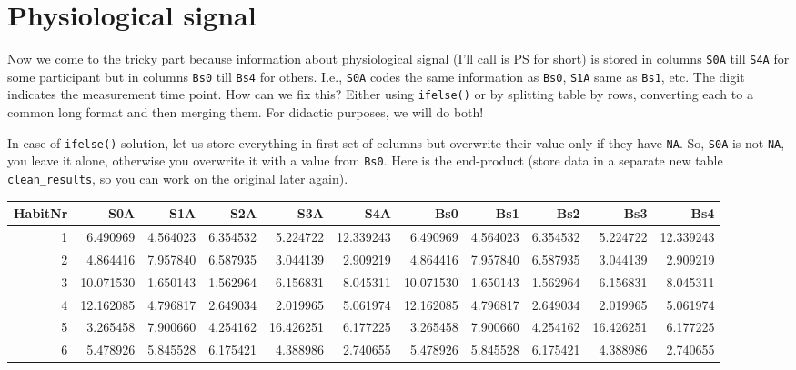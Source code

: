\documentclass[
]{book}
\begin{document}
\hypertarget{physiological-signal}{%
\section{Physiological signal}\label{physiological-signal}}

Now we come to the tricky part because information about physiological signal (I'll call is PS for short) is stored in columns \texttt{S0A} till \texttt{S4A} for some participant but in columns \texttt{Bs0} till \texttt{Bs4} for others. I.e., \texttt{S0A} codes the same information as \texttt{Bs0}, \texttt{S1A} same as \texttt{Bs1}, etc. The digit indicates the measurement time point. How can we fix this? Either using \texttt{ifelse()} or by splitting table by rows, converting each to a common long format and then merging them. For didactic purposes, we will do both!

In case of \texttt{ifelse()} solution, let us store everything in first set of columns but overwrite their value only if they have \texttt{NA}. So, \texttt{S0A} is not \texttt{NA}, you leave it alone, otherwise you overwrite it with a value from \texttt{Bs0}. Here is the end-product (store data in a separate new table \texttt{clean\_results}, so you can work on the original later again).

\begin{tabular}{r|r|r|r|r|r|r|r|r|r|r}
\hline
HabitNr & S0A & S1A & S2A & S3A & S4A & Bs0 & Bs1 & Bs2 & Bs3 & Bs4\\
\hline
1 & 6.490969 & 4.564023 & 6.354532 & 5.224722 & 12.339243 & 6.490969 & 4.564023 & 6.354532 & 5.224722 & 12.339243\\
\hline
2 & 4.864416 & 7.957840 & 6.587935 & 3.044139 & 2.909219 & 4.864416 & 7.957840 & 6.587935 & 3.044139 & 2.909219\\
\hline
3 & 10.071530 & 1.650143 & 1.562964 & 6.156831 & 8.045311 & 10.071530 & 1.650143 & 1.562964 & 6.156831 & 8.045311\\
\hline
4 & 12.162085 & 4.796817 & 2.649034 & 2.019965 & 5.061974 & 12.162085 & 4.796817 & 2.649034 & 2.019965 & 5.061974\\
\hline
5 & 3.265458 & 7.900660 & 4.254162 & 16.426251 & 6.177225 & 3.265458 & 7.900660 & 4.254162 & 16.426251 & 6.177225\\
\hline
6 & 5.478926 & 5.845528 & 6.175421 & 4.388986 & 2.740655 & 5.478926 & 5.845528 & 6.175421 & 4.388986 & 2.740655\\
\hline
\end{tabular}
\end{document}
